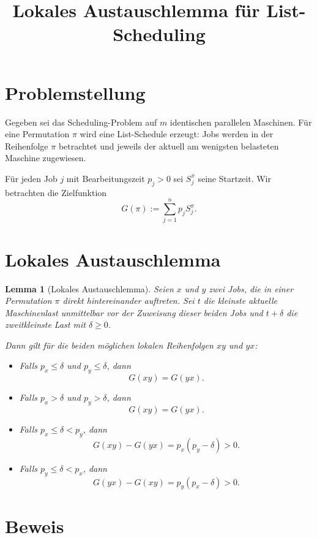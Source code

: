 \documentclass[a4paper,11pt]{article}
\title{Lokales Austauschlemma für List-Scheduling}
\author{}
\date{}
\newtheorem{lemma}{Lemma}
\begin{document}
\maketitle

\section*{Problemstellung}

Gegeben sei das Scheduling-Problem auf $m$ identischen parallelen Maschinen.
Für eine Permutation $\pi$ wird eine List-Schedule erzeugt: Jobs werden in der
Reihenfolge $\pi$ betrachtet und jeweils der aktuell am wenigsten belasteten
Maschine zugewiesen.

Für jeden Job $j$ mit Bearbeitungszeit $p_j > 0$ sei $S_j^\pi$ seine Startzeit.
Wir betrachten die Zielfunktion
\[
G(\pi) := \sum_{j=1}^n p_j S_j^\pi.
\]

\section*{Lokales Austauschlemma}

\begin{lemma}[Lokales Austauschlemma]
Seien $x$ und $y$ zwei Jobs, die in einer Permutation $\pi$ direkt hintereinander
auftreten. Sei $t$ die kleinste aktuelle Maschinenlast unmittelbar vor der
Zuweisung dieser beiden Jobs und $t+\delta$ die zweitkleinste Last mit
$\delta \ge 0$.

Dann gilt für die beiden möglichen lokalen Reihenfolgen $xy$ und $yx$:

\begin{itemize}
    \item Falls $p_x \le \delta$ und $p_y \le \delta$, dann
    \[
    G(xy) = G(yx).
    \]

    \item Falls $p_x > \delta$ und $p_y > \delta$, dann
    \[
    G(xy) = G(yx).
    \]

    \item Falls $p_x \le \delta < p_y$, dann
    \[
    G(xy) - G(yx) = p_x (p_y - \delta) > 0.
    \]

    \item Falls $p_y \le \delta < p_x$, dann
    \[
    G(yx) - G(xy) = p_y (p_x - \delta) > 0.
    \]
\end{itemize}
\end{lemma}

\section*{Beweis}
\end{document}
